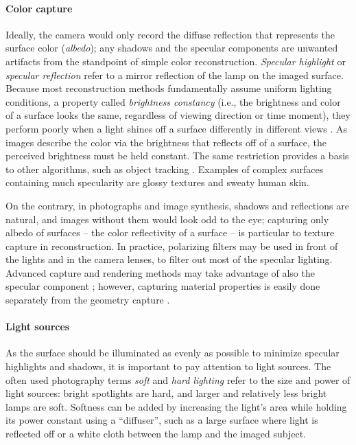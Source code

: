 \paragraph{Color capture}
Ideally, the camera would only record the diffuse reflection that represents the surface color (\emph{albedo});
any shadows and the specular components are unwanted artifacts from the standpoint of simple color reconstruction.
\emph{Specular highlight} or \emph{specular reflection} refer to a mirror reflection of the lamp on the imaged surface.
Because most reconstruction methods fundamentally assume uniform lighting conditions, a property called \emph{brightness constancy} (i.e., the brightness and color of a surface looks the same, regardless of viewing direction or time moment), they perform poorly when a light shines off a surface differently in different views \cite[ch.~8.3]{trucco1998introductory}.
As images describe the color via the brightness that reflects off of a surface, the perceived brightness must be held constant.
The same restriction provides a basis to other algorithms, such as object tracking \cite{horn1974determining,horn1981determining}.
Examples of complex surfaces containing much specularity are glossy textures and sweaty human skin.

On the contrary, in photographs and image synthesis, shadows and reflections are natural, and images without them would look odd to the eye; capturing only albedo of surfaces -- the color reflectivity of a surface -- is particular to texture capture in reconstruction.
In practice, polarizing filters may be used in front of the lights and in the camera lenses, to filter out most of the specular lighting.
Advanced capture and rendering methods may take advantage of also the specular component \cite{ghosh2011multiview}; however, capturing material properties is easily done separately from the geometry capture \cite{aittala2013practical}.

\paragraph{Light sources}
As the surface should be illuminated as evenly as possible to minimize specular highlights and shadows, it is important to pay attention to light sources.
The often used photography terms \emph{soft} and \emph{hard lighting} refer to the size and power of light sources: bright spotlights are hard, and larger and relatively less bright lamps are soft.
Softness can be added by increasing the light's area while holding its power constant using a ``diffuser'', such as a large surface where light is reflected off or a white cloth between the lamp and the imaged subject.
\cite[p.~108]{langford2000basic}

